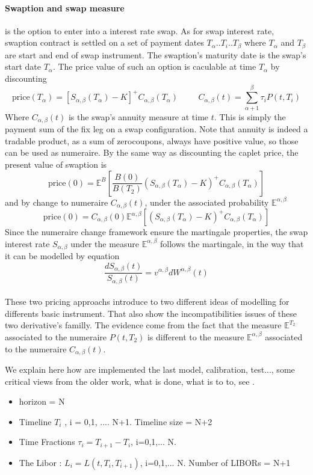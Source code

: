 \documentclass[a4paper,10pt]{article}
\newcommand{\Ti}{T_{i}}
\newcommand{\Ta}{T_{\alpha}}
\newcommand{\Tb}{T_{\beta}}
\newcommand{\Tii}{T_{i+1}}
\newcommand{\Pti}{P(t,T_{i})}
\newcommand{\Sab}{S_{\alpha,\beta}}
\newcommand{\Cab}{C_{\alpha,\beta}}
\newcommand{\Eab}{\mathbb{E}^{\alpha,\beta}}
\begin{document}
\paragraph{ Swaption and swap measure } is the option to enter into a interest rate swap. As for swap interest rate, swaption contract is settled on a set of payment dates $\Ta.. T_i.. \Tb$ where $\Ta$ and $\Tb$ are start and end of swap instrument. The swaption's maturity date is the swap's start date $\Ta$. The price value of such an option is caculable at time $\Ta$ by discounting
\[
\text{price}(\Ta) = \left[ \Sab(\Ta) - K \right]^+ \Cab(\Ta)
\hspace{1cm}
\Cab(t) = \sum^{\beta}_{\alpha+1} \tau_i \Pti 
\]  
Where $\Cab(t)$ is the swap's annuity measure at time $t$. This is simply the payment sum of the fix leg on a swap configuration. Note that annuity is indeed a tradable product, as a sum of zerocoupons, always have positive value, so those can be used as numeraire. By the same way as discounting the caplet price, the present value of swaption is
\[
\text{price}(0) = \mathbb{E}^{B}\left[ \frac{B(0)}{B(T_2)} (\Sab(\Ta) - K )^+ \Cab(\Ta)  \right]
\]
and by change to numeraire $\Cab(t)$, under the associated probability $\Eab$
\[
\text{price}(0) = \Cab(0) \Eab \left[ (\Sab(\Ta) - K )^+ \Cab(\Ta)  \right]
\]
Since the numeraire change framework ensure the martingale properties, the swap interest rate $\Sab$ under the measure $\Eab$ follows the martingale, in the way that it can be modelled by equation
\[
\frac{d\Sab(t)}{\Sab(t)} = v^{\alpha,\beta}dW^{\alpha,\beta}(t)
\]
\paragraph{} These two pricing approachs introduce to two different ideas of modelling for differents basic instrument. That also show the incompatibilities issues of these two derivative's familly. The evidence come from the fact that the measure $\mathbb{E}^{T_2}$ associated to the numeraire $P(t,T_2)$ is different to the measure $\Eab$ associated to the numeraire $\Cab(t)$.   





\newpage
We explain here how are implemented the last model, calibration, test..., some critical views from the older work, what is done, what is to to, see \cite{THAI2013}.
\begin{itemize}
 \item horizon  = N
 \item Timeline $T_i$ , i = 0,1, .... N+1. Timeline size = N+2
 \item Time Fractions $\tau_i = \Tii-\Ti$, i=0,1,... N. 
 \item The Libor : $L_i = L(t,T_i,T_{i+1})$, i=0,1,... N. Number of LIBORs = N+1
\end{itemize}
\end{document}
